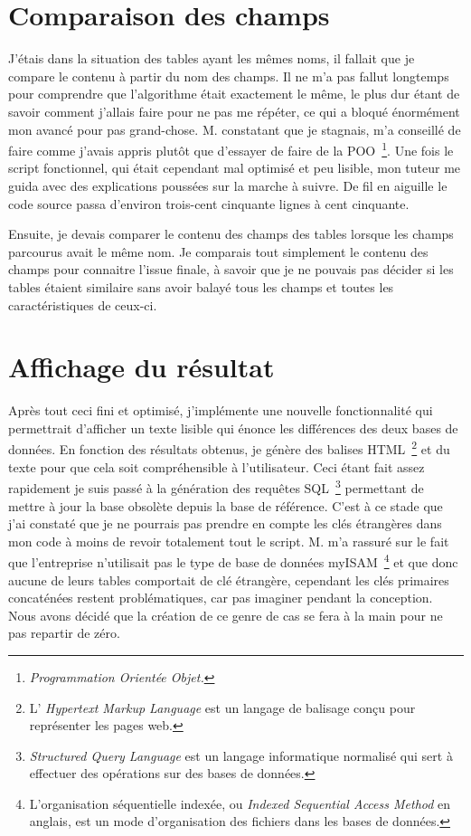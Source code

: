 \section{Comparaison des champs}

J'étais dans la situation des tables ayant les mêmes noms, il fallait que je
compare le contenu à partir du nom des champs. Il ne m'a pas fallut longtemps
pour comprendre que l'algorithme était exactement le même, le plus dur étant de
savoir comment j'allais faire pour ne pas me répéter, ce qui a bloqué
énormément mon avancé pour pas grand-chose. M. constatant que je
stagnais, m'a conseillé de faire comme j'avais appris plutôt que d'essayer de
faire de la POO\, \footnote{\emph{Programmation Orientée Objet.}}.  Une fois le
script fonctionnel, qui était cependant mal optimisé et peu lisible, mon tuteur
me guida avec des explications poussées sur la marche à suivre. De fil en
aiguille le code source passa d'environ trois-cent cinquante lignes à cent
cinquante.

Ensuite, je devais comparer le contenu des champs des tables lorsque les champs
parcourus avait le même nom. Je comparais tout simplement le contenu des champs
pour connaitre l'issue finale, à savoir que je ne pouvais pas décider si les
tables étaient similaire sans avoir balayé tous les champs et toutes les
caractéristiques de ceux-ci.

\section{Affichage du résultat}

Après tout ceci fini et optimisé, j'implémente une nouvelle fonctionnalité qui
permettrait d'afficher un texte lisible qui énonce les différences des deux
bases de données. En fonction des résultats obtenus, je génère des balises HTML\,
\footnote{L’ \emph{Hypertext Markup Language} est un langage de balisage conçu
pour représenter les pages web.} et du texte pour que cela soit compréhensible
à l'utilisateur. Ceci étant fait assez rapidement je suis passé à la génération
des requêtes SQL\, \footnote{\emph{Structured Query Language} est un langage
informatique normalisé qui sert à effectuer des opérations sur des bases de
données.} permettant de mettre à jour la base obsolète depuis la base de
référence. C'est à ce stade que j'ai constaté que je ne pourrais pas prendre en
compte les clés étrangères dans mon code à moins de revoir totalement tout le
script. M. m'a rassuré sur le fait que l'entreprise n'utilisait pas
le type de base de données myISAM\, \footnote{L'organisation séquentielle
indexée, ou \emph{Indexed Sequential Access Method} en anglais, est un mode
d'organisation des fichiers dans les bases de données.} et que donc aucune de
leurs tables comportait de clé étrangère, cependant les clés primaires
concaténées restent problématiques, car pas imaginer pendant la conception. Nous
avons décidé que la création de ce genre de cas se fera à la main pour ne pas
repartir de zéro.

